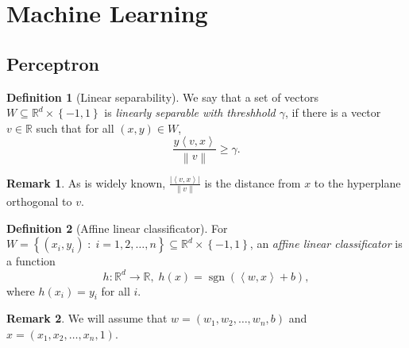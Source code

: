 \documentclass{article}
\theoremstyle{definition}
\newtheorem{definition}{Definition}[section]
\newtheorem{remark}{Remark}[section]
\begin{document}
  \section{Machine Learning}

  \subsection{Perceptron}

  \begin{definition}[Linear separability]
    We say that a set of vectors \( W \subseteq \mathbb{R}^d \times
    \left\{ -1, 1 \right\} \) is \emph{linearly separable with
    threshhold \( \gamma \)}, if there is a vector \( v \in \mathbb{R}
    \) such that for all \( \left( x,y \right) \in W \),
    \[
      \frac{y \left\langle v, x \right\rangle}{\left\|v\right\|} \geq \gamma.
    \]
  \end{definition}

  \begin{remark}
    As is widely known, \( \frac{\left| \left\langle v, x \right\rangle
    \right|}{\left\|v\right\|} \) is the distance from \( x \) to the
    hyperplane orthogonal to \( v \).
  \end{remark}

  \begin{definition}[Affine linear classificator]
    For \( W = \left\{ (x_i, y_i) \; : \; i = 1, 2, \dots, n \right\}
    \subseteq \mathbb{R}^d \times \left\{ -1, 1 \right\} \), an
    \emph{affine linear classificator} is a function
    \[
      h: \mathbb{R}^d \rightarrow \mathbb{R},\; h(x) =
      \operatorname{sgn}(\left\langle w, x \right\rangle + b),
    \]
    where \( h(x_i) = y_i \) for all \( i \).
  \end{definition}

  \begin{remark}
    We will assume that \( w = \left( w_1, w_2, \dots, w_n, b \right)
    \) and \( x = \left( x_1, x_2, \dots, x_n, 1 \right) \).
  \end{remark}

  
\end{document}
